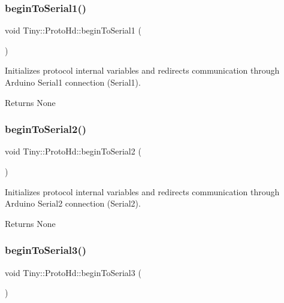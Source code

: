 \subsubsection{\texorpdfstring{begin\+To\+Serial1()}{beginToSerial1()}}
{\footnotesize\ttfamily void Tiny\+::\+Proto\+Hd\+::begin\+To\+Serial1 (\begin{DoxyParamCaption}{ }\end{DoxyParamCaption})\hspace{0.3cm}{\ttfamily [inline]}}

Initializes protocol internal variables and redirects communication through Arduino Serial1 connection (Serial1). \begin{DoxyReturn}{Returns}
None 
\end{DoxyReturn}
\mbox{\label{classTiny_1_1ProtoHd_a450fc792e515ffd150072988bc632c9e}} 
\subsubsection{\texorpdfstring{begin\+To\+Serial2()}{beginToSerial2()}}
{\footnotesize\ttfamily void Tiny\+::\+Proto\+Hd\+::begin\+To\+Serial2 (\begin{DoxyParamCaption}{ }\end{DoxyParamCaption})\hspace{0.3cm}{\ttfamily [inline]}}

Initializes protocol internal variables and redirects communication through Arduino Serial2 connection (Serial2). \begin{DoxyReturn}{Returns}
None 
\end{DoxyReturn}
\mbox{\label{classTiny_1_1ProtoHd_acd6519f6652c279b3a3b98aabbaeed65}} 
\subsubsection{\texorpdfstring{begin\+To\+Serial3()}{beginToSerial3()}}
{\footnotesize\ttfamily void Tiny\+::\+Proto\+Hd\+::begin\+To\+Serial3 (\begin{DoxyParamCaption}{ }\end{DoxyParamCaption})\hspace{0.3cm}{\ttfamily [inline]}}

